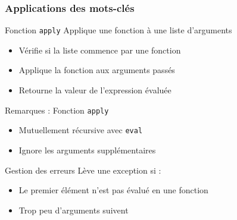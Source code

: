 \documentclass[info]{ensrennesbeamer}
\begin{document}
\subsubsection{Applications des mots-clés}
\begin{frame}
	\begin{block}{Fonction \lstinline[][apply[}
		Applique une fonction à une liste d'arguments
		\begin{itemize}
			\item Vérifie si la liste commence par une fonction
			\item Applique la fonction aux arguments passés
			\item Retourne la valeur de l'expression évaluée
		\end{itemize}
	\end{block}

\end{frame}

\begin{frame}	
	\begin{exampleblock}{Remarques : Fonction \lstinline[][apply[}
		\begin{itemize}
			\item Mutuellement récursive avec \lstinline[][eval[
			\item Ignore les arguments supplémentaires
		\end{itemize}
	\end{exampleblock}
	
	\begin{alertblock}{Gestion des erreurs}
		Lève une exception si :
		\begin{itemize}
			\item Le premier élément n'est pas évalué en une fonction
			\item Trop peu d'arguments suivent
		\end{itemize}
	\end{alertblock}
	
\end{frame}
\end{document}

